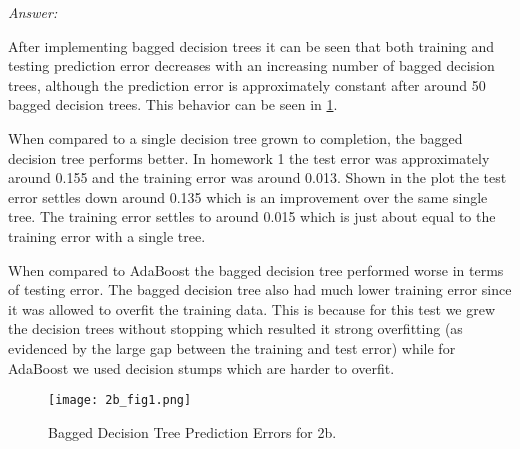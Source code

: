 \documentclass[12pt, fullpage,letterpaper]{article}
\begin{document}
\begin{enumerate}
\begin{enumerate}
	\textit{Answer:}

	After implementing bagged decision trees it can be seen that both training and testing prediction error decreases with an increasing number of bagged decision trees, although the prediction error is approximately constant after around 50 bagged decision trees.
	This behavior can be seen in \ref{fig:2b}.

	When compared to a single decision tree grown to completion, the bagged decision tree performs better.
	In homework 1 the test error was approximately around 0.155 and the training error was around 0.013.
	Shown in the plot the test error settles down around 0.135 which is an improvement over the same single tree.
	The training error settles to around 0.015 which is just about equal to the training error with a single tree.

	When compared to AdaBoost the bagged decision tree performed worse in terms of testing error.  
	The bagged decision tree also had much lower training error since it was allowed to overfit the training data. 
	This is because for this test we grew the decision trees without stopping which resulted it strong overfitting (as evidenced by the large gap between the training and test error) while for AdaBoost we used decision stumps which are harder to overfit.

	\begin{figure}[h]
	\begin{center}
	\texttt{[image: 2b\_fig1.png]}
	\end{center}
	\caption{Bagged Decision Tree Prediction Errors for 2b.}
	\label{fig:2b}
	\end{figure}


\end{enumerate}
\end{enumerate}
\end{document}

